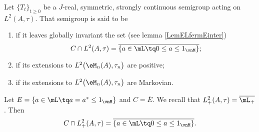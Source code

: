 Let $\{ T_t \}_{t\geq 0}$ be a $J$-real, symmetric, strongly continuous semigroup acting on $L^2(A,\tau)$. That semigroup is said to be
\begin{enumerate}
	\item
         if it leaves globally invariant the set (see lemma \ref{LemELfermEinter})
		\begin{equation}
			C\cap L^2(A,\tau)=\overline{ \{ a\in\mL\tq 0\leq a\leq 1_{\vnM} \} };
		\end{equation}
	\item
		 if its extensions to $L^2\big( \eM_n(A),\tau_n \big)$ are positive;
	\item
		 if its extensions to $L^2\big( \eM_n(A),\tau_n \big)$ are Markovian.
\end{enumerate}

\begin{lemma}       \label{LemELfermEinter}
    Let \(E=\{ a\in\mL\tq a=a^*\leq 1_{\vnM} \}\) and \(C=\overline{ E }\). We recall that \(L_+^2(A,\tau)=\overline{ \mL_+ }\). Then
    \begin{equation}
        C\cap L_+^2(A,\tau)=\overline{ \{ a\in\mL\tq 0\leq a\leq 1_{\vnM} \} }.
    \end{equation}
\end{lemma}

